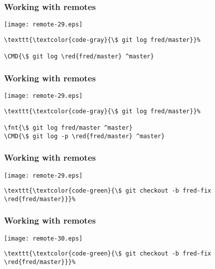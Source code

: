 \documentclass[english]{beamer}
\newcommand{\CMD}[1]{%
\texttt{\textcolor{code-green}{#1}}%
}
\newcommand{\fnt}[1]{%
\texttt{\textcolor{code-gray}{#1}}%
}
\newcommand{\red}[1]{%
\textcolor{code-red}{#1}%
}
\begin{document}
\begin{frame}[fragile]
\frametitle{Working with remotes}

\texttt{[image: remote-29.eps]}

\begin{Verbatim}[commandchars=\\\{\}]
\fnt{\$ git log fred/master}
\CMD{\$ git log \red{fred/master} ^master}
\end{Verbatim}

\vspace{\textheight}
\end{frame}

\begin{frame}[fragile]
\frametitle{Working with remotes}

\texttt{[image: remote-29.eps]}

\begin{Verbatim}[commandchars=\\\{\}]
\fnt{\$ git log fred/master}
\fnt{\$ git log fred/master ^master}
\CMD{\$ git log -p \red{fred/master} ^master}
\end{Verbatim}

\vspace{\textheight}
\end{frame}

\begin{frame}[fragile]
\frametitle{Working with remotes}

\texttt{[image: remote-29.eps]}

\begin{Verbatim}[commandchars=\\\{\}]
\CMD{\$ git checkout -b fred-fix \red{fred/master}}
\end{Verbatim}

\vspace{\textheight}
\end{frame}

\begin{frame}[fragile]
\frametitle{Working with remotes}

\texttt{[image: remote-30.eps]}

\begin{Verbatim}[commandchars=\\\{\}]
\CMD{\$ git checkout -b fred-fix \red{fred/master}}
\end{Verbatim}

\vspace{\textheight}
\end{frame}
\end{document}
